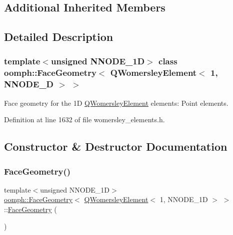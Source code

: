 \subsection*{Additional Inherited Members}


\subsection{Detailed Description}
\subsubsection*{template$<$unsigned N\+N\+O\+D\+E\+\_\+1D$>$\newline
class oomph\+::\+Face\+Geometry$<$ Q\+Womersley\+Element$<$ 1, N\+N\+O\+D\+E\+\_\+D $>$ $>$}

Face geometry for the 1D \hyperlink{classoomph_1_1QWomersleyElement}{Q\+Womersley\+Element} elements\+: Point elements. 

Definition at line 1632 of file womersley\+\_\+elements.\+h.



\subsection{Constructor \& Destructor Documentation}
\mbox{\label{classoomph_1_1FaceGeometry_3_01QWomersleyElement_3_011_00_01NNODE__1D_01_4_01_4_a565684012c2ea2a9abfc9364d2905448}} 
\subsubsection{\texorpdfstring{Face\+Geometry()}{FaceGeometry()}}
{\footnotesize\ttfamily template$<$unsigned N\+N\+O\+D\+E\+\_\+1D$>$ \\
\hyperlink{classoomph_1_1FaceGeometry}{oomph\+::\+Face\+Geometry}$<$ \hyperlink{classoomph_1_1QWomersleyElement}{Q\+Womersley\+Element}$<$ 1, N\+N\+O\+D\+E\+\_\+1D $>$ $>$\+::\hyperlink{classoomph_1_1FaceGeometry}{Face\+Geometry} (\begin{DoxyParamCaption}{ }\end{DoxyParamCaption})\hspace{0.3cm}{\ttfamily [inline]}}




